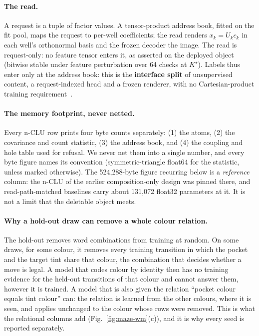 \documentclass{article} %
\newcommand{\Kstar}{\ensuremath{K^{\star}}}
\begin{document}
\paragraph{The read.} A request is a tuple of factor values. A tensor-product address book,
fitted on the fit pool, maps the request to per-well coefficients; the read renders
$x_k=U_k c_k$ in each well's orthonormal basis and the frozen decoder the image.
The read is request-only: no feature tensor enters it, as asserted on the deployed object
(bitwise stable under feature perturbation over 64 checks at $\Kstar$).
Labels thus enter only at the address book: this is the \textbf{interface split} of unsupervised content, a request-indexed head and a frozen renderer, with no
Cartesian-product training requirement~\citep{wiedemer_compositional_2023,lachapelle_additive_2023,montero_lost_2022}.

\paragraph{The memory footprint, never netted.} Every n-CLU row prints four byte counts
separately: (1) the atoms, (2) the covariance and count statistic, (3) the address book, and
(4) the coupling and hole table used for refusal.
We never net them into a single number, and every byte figure names its convention
(symmetric-triangle float64 for the statistic, unless marked otherwise). The 524,288-byte figure
recurring below is a \emph{reference} column: the n-CLU of the earlier composition-only design
was pinned there, and read-path-matched baselines carry about 131,072 float32 parameters at it. %
It is not a limit that the deletable object meets.

\paragraph{Why a hold-out draw can remove a whole colour relation.} The hold-out removes word
combinations from training at random. On some draws, for some colour, it removes every training
transition in which the pocket and the target tint share that colour, the combination that decides
whether a move is legal. A model that codes colour by identity then has no training evidence for the
held-out transitions of that colour and cannot answer them, however it is trained. A model that is
also given the relation ``pocket colour equals tint colour'' can: the relation is learned from the
other colours, where it is seen, and applies unchanged to the colour whose rows were removed. This is
what the relational columns add (Fig.~\ref{fig:maze-wm}(c)), and it is why every seed is reported
separately.
\end{document}
